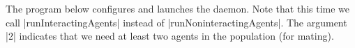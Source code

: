 The program below configures and launches the daemon.
Note that this time we call |runInteractingAgents| instead of |runNoninteractingAgents|.
The argument |2| indicates that we need at least two agents in the population (for mating).


